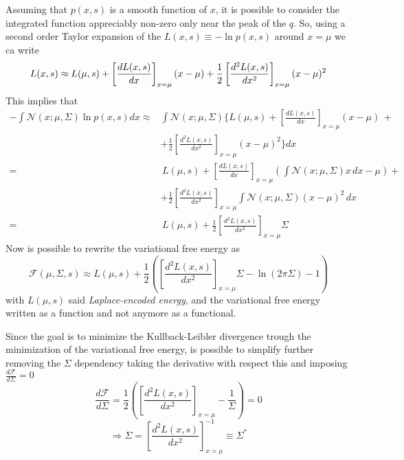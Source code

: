 \documentclass[10pt]{article}
\begin{document}
Assuming that $p(x,s)$ is a smooth function of $x$, it is possible to consider the integrated function appreciably non-zero only near the peak of the $q$. So, using a second order Taylor expansion of the $L(x,s) \equiv - \ln p(x,s)$ around $x=\mu$ we ca write
\begin{equation}
L(x,s) \approx L(\mu,s) + \left[ \frac{dL(x,s)}{dx} \right]_{x=\mu} (x-\mu) + \frac{1}{2} \left[ \frac{d^2L(x,s)}{dx^2} \right]_{x=\mu} (x-\mu)^2 \\
\end{equation}
This implies that
\begin{equation}
    \begin{split}
        - \int \mathcal{N}(x;\mu,\Sigma) \ln p(x,s) d x \approx & \int \mathcal{N}(x;\mu,\Sigma) \Big\lbrace L(\mu,s) + \left[ \frac{dL(x,s)}{dx} \right]_{x=\mu} (x-\mu) \, + \\
        & + \frac{1}{2} \left[ \frac{d^2L(x,s)}{dx^2} \right]_{x=\mu} (x-\mu)^2 \Big\rbrace d x \\
        = & \, L(\mu,s) + \left[ \frac{dL(x,s)}{dx} \right]_{x=\mu} \left( \int \mathcal{N}(x;\mu,\Sigma) x \, dx - \mu \right) + \\
        & + \frac{1}{2} \left[ \frac{d^2L(x,s)}{dx^2} \right]_{x=\mu} \int \mathcal{N}(x;\mu,\Sigma) (x-\mu)^2 \, dx\\
        = & \, L(\mu,s) + \frac{1}{2} \left[ \frac{d^2L(x,s)}{dx^2} \right]_{x=\mu} \Sigma
    \end{split}
\end{equation}
Now is possible to rewrite the variational free energy as
\begin{equation}
\mathcal{F}(\mu, \Sigma, s) \approx L(\mu, s) + \frac{1}{2}\left( \left[ \frac{d^2L(x,s)}{dx^2} \right]_{x=\mu} \Sigma - \ln (2 \pi \Sigma) -1 \right)
\end{equation}
with $L(\mu, s)$ said \emph{Laplace-encoded energy}, and the variational free energy written as a function and not anymore as a functional.

Since the goal is to minimize the Kullback-Leibler divergence trough the minimization of the variational free energy, is possible to simplify further removing the $\Sigma$ dependency taking the derivative with respect this and imposing $\frac{d\mathcal{F}}{d\Sigma}=0$
\begin{equation}
\frac{d\mathcal{F}}{d\Sigma}= \frac{1}{2} \left( \left[ \frac{d^2L(x,s)}{dx^2} \right]_{x=\mu} - \frac{1}{\Sigma} \right) = 0
\end{equation}
\begin{equation}
\Rightarrow \Sigma = \left[ \frac{d^2L(x,s)}{dx^2} \right]_{x=\mu}^{-1} \equiv \Sigma^{\ast}
\label{eq:variance_laplace}
\end{equation}
\end{document}
